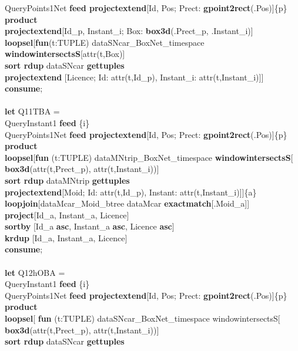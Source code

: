 \documentclass[a4paper]{article}
\newcommand{\op}[1]{\textbf{#1}}
\begin{document}
\begin{scriptsize}
\begin{tabbing}
\>QueryPoints1Net \op{feed projectextend}[Id, Pos; Prect:
\op{gpoint2rect}(.Pos)]\{p\}\\
\>\op{product}\\
\>\op{projectextend}[Id\_p, Instant\_i; Box: \op{box3d}(.Prect\_p,
.Instant\_i)]\\
\>\op{loopsel}[\op{fun}(t:TUPLE) dataSNcar\_BoxNet\_timespace
\op{windowintersectsS}[attr(t,Box)]\\
\>\>\op{sort rdup} dataSNcar \op{gettuples}\\
\>\>\op{projectextend} [Licence; Id: attr(t,Id\_p), Instant\_i:
attr(t,Instant\_i)]]\\
\op{consume};\\
\\
\op{let} Q11TBA =\\
\>QueryInstant1 \op{feed} \{i\}\\
\>QueryPoints1Net \op{feed projectextend}[Id, Pos; Prect:
\op{gpoint2rect}(.Pos)]\{p\}\\
\>\op{product}\\
\>\op{loopsel}[\op{fun} (t:TUPLE) dataMNtrip\_BoxNet\_timespace
\op{windowintersectsS}[\\
\>\>\>\op{box3d}(attr(t,Prect\_p), attr(t,Instant\_i))]\\
\>\>\op{sort rdup} dataMNtrip \op{gettuples}\\
\>\>\op{projectextend}[Moid; Id: attr(t,Id\_p), Instant:
attr(t,Instant\_i)]]\{a\}\\
\>\op{loopjoin}[dataMcar\_Moid\_btree dataMcar \op{exactmatch}[.Moid\_a]]\\
\>\op{project}[Id\_a, Instant\_a, Licence]\\
\>\op{sortby} [Id\_a \op{asc}, Instant\_a \op{asc}, Licence \op{asc}]\\
\>\op{krdup} [Id\_a, Instant\_a, Licence]\\
\op{consume};\\
\\
\op{let} Q12hOBA =\\
\>QueryInstant1 \op{feed} \{i\}\\
\>QueryPoints1Net \op{feed projectextend}[Id, Pos; Prect:
\op{gpoint2rect}(.Pos)]\{p\}\\
\>\op{product}\\
\>\op{loopsel}[ \op{fun} (t:TUPLE) dataSNcar\_BoxNet\_timespace
windowintersectsS[\\
\>\>\>\op{box3d}(attr(t,Prect\_p), attr(t,Instant\_i))]\\
\>\>\op{sort rdup} dataSNcar \op{gettuples}\\

\end{tabbing}
\end{scriptsize}
\end{document}
